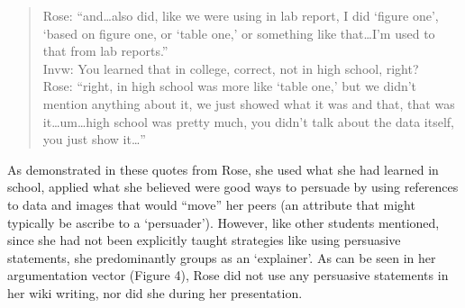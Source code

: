 \documentclass[11.5pt]{sig-alternate} %
\begin{document}
\begin{large}
\begin{quote}
Rose: “and…also did, like we were using in lab report, I did ‘figure one’, ‘based on figure one, or ‘table one,’ or something like that…I’m used to that from lab reports.” \\
Invw: You learned that in college, correct, not in high school, right? \\
Rose: “right, in high school was more like ‘table one,’ but we didn’t mention anything about it, we just showed what it was and that, that was it…um…high school was pretty much, you didn’t talk about the data itself, you just show it…”
\end{quote}

As demonstrated in these quotes from Rose, she used what she had learned in school, applied what she believed were good ways to persuade by using references to data and images that would “move” her peers (an attribute that might typically be ascribe to a ‘persuader’). However, like other students mentioned, since she had not been explicitly taught strategies like using persuasive statements, she predominantly groups as an ‘explainer’. As can be seen in her argumentation vector (Figure 4), Rose did not use any persuasive statements in her wiki writing, nor did she during her presentation.


\end{large}
\end{document}
